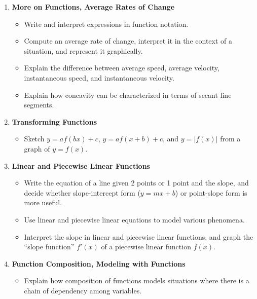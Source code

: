 \documentclass{article}
\begin{document}
\begin{enumerate}
\item \textbf{More on Functions, Average Rates of Change} %
  \begin{itemize}

  \item Write and interpret expressions in function notation.

  \item Compute an average rate of change, interpret it in the context of a situation, and represent it graphically.

  \item Explain the difference between average speed, average velocity, instantaneous speed, and instantaneous velocity.

  \item Explain how concavity can be characterized in terms of secant line segments.

  \end{itemize}

\item \textbf{Transforming Functions} %
  \begin{itemize}
  \item Sketch $y = a f(bx) + c$, $y = a f(x + b) + c$, and $y = |f(x)|$
    from a graph of $y = f(x)$.

  \end{itemize}

\item \textbf{Linear and Piecewise Linear Functions} %
  \begin{itemize} 
  \item Write the equation of a line given 2 points or 1 point and the
    slope, and decide whether slope-intercept form ($y = mx + b$) or
    point-slope form is more useful. 

  \item Use linear and piecewise linear equations to model various
    phenomena.

  \item Interpret the slope in linear and piecewise linear functions, 
    and graph the ``slope function'' $f'(x)$ of a piecewise linear
    function $f(x)$.  

  \end{itemize}

\item \textbf{Function Composition, Modeling with Functions} %
  \begin{itemize}
  \item Explain how composition of functions models situations where there is a chain of dependency among variables.


\end{itemize}
\end{enumerate}
\end{document}
